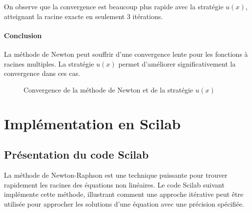 \documentclass{article}
\begin{document}
On observe que la convergence est beaucoup plus rapide avec la stratégie \( u(x) \), atteignant la racine exacte en seulement 3 itérations.

\paragraph{Conclusion \\ }
La méthode de Newton peut souffrir d'une convergence lente pour les fonctions à racines multiples. La stratégie \( u(x) \) permet d'améliorer significativement la convergence dans ces cas.



\begin{figure}[h!]
\centering
{}
\caption{Convergence de la méthode de Newton et de la stratégie \( u(x) \)}
\end{figure}


\section{Implémentation en Scilab}
\subsection{Présentation du code Scilab}
La méthode de Newton-Raphson est une technique puissante pour trouver rapidement les racines des équations non linéaires. Le code Scilab suivant implémente cette méthode, illustrant comment une approche itérative peut être utilisée pour approcher les solutions d'une équation avec une précision spécifiée.
\end{document}
